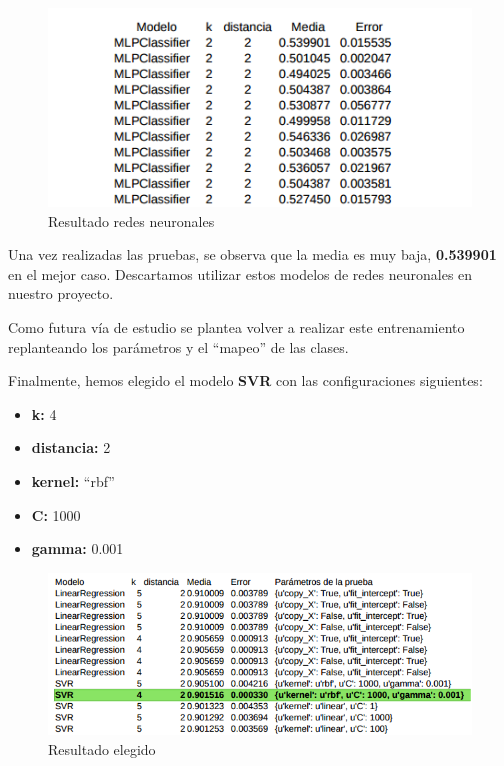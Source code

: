 \begin{figure}[htb]
	\begin{center}
		\includegraphics[width=14cm]{figures/resultado_mlp.png}
		\caption{Resultado redes neuronales}
	\end{center}
    \label{resultado_mlp}
\end{figure}

Una vez realizadas las pruebas, se observa que la media es muy baja, \textbf{0.539901} en el mejor caso. Descartamos utilizar estos modelos de redes neuronales en nuestro proyecto.

Como futura vía de estudio se plantea volver a realizar este entrenamiento replanteando los parámetros y el ``mapeo'' de las clases.

Finalmente, hemos elegido el modelo \textbf{SVR} con las configuraciones siguientes:

\begin{itemize}
	\item \textbf{k:} 4
	\item \textbf{distancia:} 2
	\item \textbf{kernel:} ``rbf''
	\item \textbf{C:} 1000
	\item \textbf{gamma:} 0.001
\end{itemize}

\begin{figure}[htb]
	\begin{center}
		\includegraphics[width=16cm]{figures/resultado_elegido.png}
		\caption{Resultado elegido}
	\end{center}
    \label{resultado_elegido}
\end{figure}

